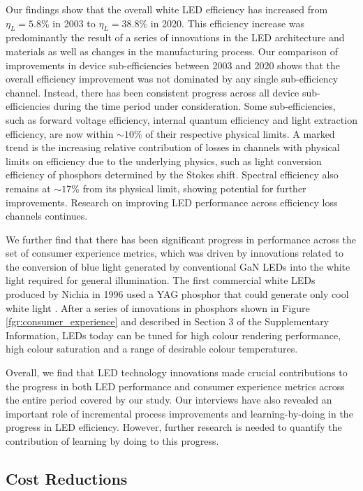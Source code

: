 \documentclass[parskip=full]{article}
\begin{document}
Our findings show that the overall white LED efficiency has increased from $\eta_L=5.8\%$ in 2003 to $\eta_L=38.8\%$ in 2020. This efficiency increase was predominantly the result of a series of innovations in the LED architecture and materials as well as changes in the manufacturing process. Our comparison of improvements in device sub-efficiencies between 2003 and 2020 shows that the overall efficiency improvement was not dominated by any single sub-efficiency channel. Instead, there has been consistent progress across all device sub-efficiencies during the time period under consideration. Some sub-efficiencies, such as forward voltage efficiency, internal quantum efficiency and light extraction efficiency, are now within $\sim10\%$ of their respective physical limits. A marked trend is the increasing relative contribution of losses in channels with physical limits on efficiency due to the underlying physics, such as light conversion efficiency of phosphors determined by the Stokes shift. Spectral efficiency also remains at $\sim17\%$ from its physical limit, showing potential for further improvements. Research on improving LED performance across efficiency loss channels continues\cite{cho2017white,Weisbuch2020}.

We further find that there has been significant progress in performance across the set of consumer experience metrics, which was driven by innovations related to the conversion of blue light generated by conventional GaN LEDs into the white light required for general illumination. The first commercial white LEDs produced by Nichia in 1996 used a YAG phosphor that could generate only cool white light \cite{bando1998development}. After a series of innovations in phosphors shown in Figure \ref{fgr:consumer_experience} and described in Section 3 of the Supplementary Information, LEDs today can be tuned for high colour rendering performance, high colour saturation and a range of desirable colour temperatures. 

Overall, we find that LED technology innovations made crucial contributions to the progress in both LED performance and consumer experience metrics across the entire period covered by our study. Our interviews have also revealed an important role of incremental process improvements and learning-by-doing\cite{WRIGHT_1936,Arrow_1962} in the progress in LED efficiency. However, further research is needed to quantify the contribution of learning by doing to this progress.

\subsection{Cost Reductions}
\end{document}

